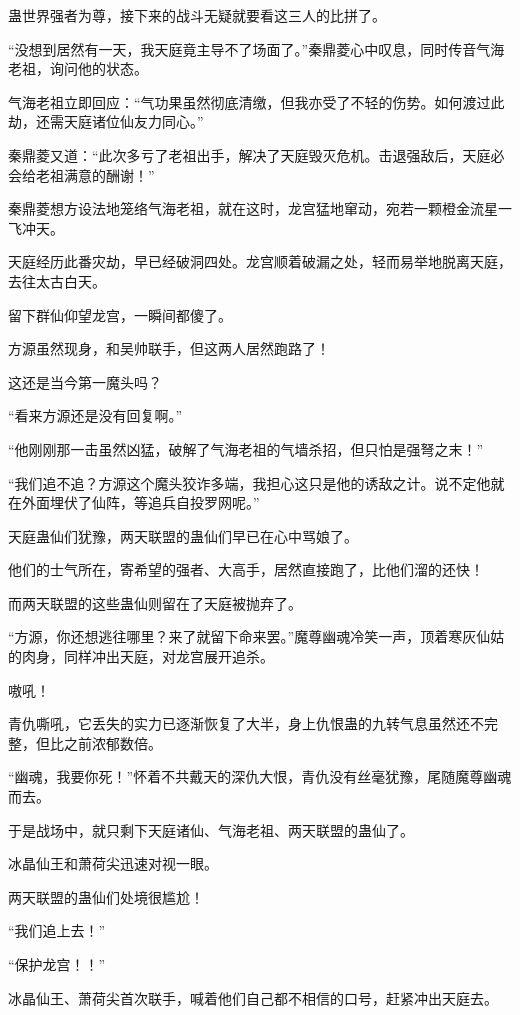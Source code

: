 \begin{this_body}
蛊世界强者为尊，接下来的战斗无疑就要看这三人的比拼了。

“没想到居然有一天，我天庭竟主导不了场面了。”秦鼎菱心中叹息，同时传音气海老祖，询问他的状态。

气海老祖立即回应：“气功果虽然彻底清缴，但我亦受了不轻的伤势。如何渡过此劫，还需天庭诸位仙友力同心。”

秦鼎菱又道：“此次多亏了老祖出手，解决了天庭毁灭危机。击退强敌后，天庭必会给老祖满意的酬谢！”

秦鼎菱想方设法地笼络气海老祖，就在这时，龙宫猛地窜动，宛若一颗橙金流星一飞冲天。

天庭经历此番灾劫，早已经破洞四处。龙宫顺着破漏之处，轻而易举地脱离天庭，去往太古白天。

留下群仙仰望龙宫，一瞬间都傻了。

方源虽然现身，和吴帅联手，但这两人居然跑路了！

这还是当今第一魔头吗？

“看来方源还是没有回复啊。”

“他刚刚那一击虽然凶猛，破解了气海老祖的气墙杀招，但只怕是强弩之末！”

“我们追不追？方源这个魔头狡诈多端，我担心这只是他的诱敌之计。说不定他就在外面埋伏了仙阵，等追兵自投罗网呢。”

天庭蛊仙们犹豫，两天联盟的蛊仙们早已在心中骂娘了。

他们的士气所在，寄希望的强者、大高手，居然直接跑了，比他们溜的还快！

而两天联盟的这些蛊仙则留在了天庭被抛弃了。

“方源，你还想逃往哪里？来了就留下命来罢。”魔尊幽魂冷笑一声，顶着寒灰仙姑的肉身，同样冲出天庭，对龙宫展开追杀。

嗷吼！

青仇嘶吼，它丢失的实力已逐渐恢复了大半，身上仇恨蛊的九转气息虽然还不完整，但比之前浓郁数倍。

“幽魂，我要你死！”怀着不共戴天的深仇大恨，青仇没有丝毫犹豫，尾随魔尊幽魂而去。

于是战场中，就只剩下天庭诸仙、气海老祖、两天联盟的蛊仙了。

冰晶仙王和萧荷尖迅速对视一眼。

两天联盟的蛊仙们处境很尴尬！

“我们追上去！”

“保护龙宫！！”

冰晶仙王、萧荷尖首次联手，喊着他们自己都不相信的口号，赶紧冲出天庭去。


\end{this_body}
